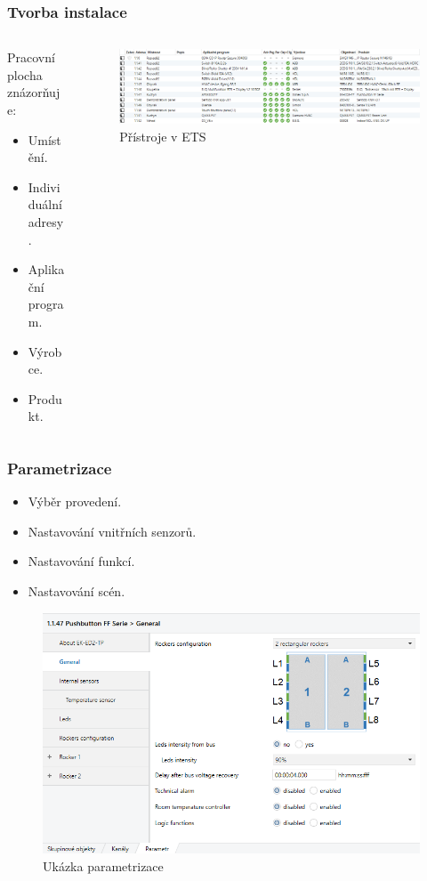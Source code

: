 \documentclass[%
  12pt,       				%
	t,                  %
	aspectratio=1610,   %
	unicode,						%
]{beamer}				    	%
\begin{document}
\begin{frame} 
	\frametitle{Tvorba instalace}
	
	\begin{columns}[T] 								%
		\begin{column}{0.35\textwidth}		%
			Pracovní plocha znázorňuje:\\[2ex]
			\begin{itemize}
				\item Umístění.
				\item Individuální adresy.
				\item Aplikační program.
				\item Výrobce.
				\item Produkt.
			\end{itemize}
		\end{column}
		\begin{column}{0.75\textwidth}		%
			\begin{figure}%
				\centering
				\vspace{1cm}	              %
				\includegraphics[width=1\columnwidth]{obrazky/Přístroje v ETS.png}
				\caption{Přístroje v ETS}
			\end{figure}
		\end{column}
	\end{columns}											%
\end{frame}

\begin{frame} 
	\frametitle{Parametrizace}
	\begin{itemize}
	    \item Výběr provedení.
	    \item Nastavování vnitřních senzorů.
	    \item Nastavování funkcí.
	    \item Nastavování scén.
	\end{itemize}
			\begin{figure}%
				\centering
				\vspace{0.2cm}	              %
				\includegraphics[width=.5\columnwidth]{obrazky/Ukazka parametrizace.png}
				\caption{Ukázka parametrizace}
			\end{figure}
\end{frame}
\end{document}

